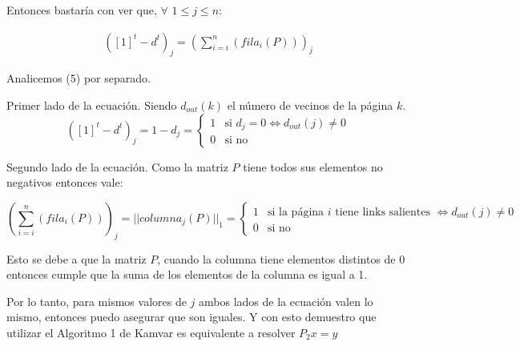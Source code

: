 Entonces bastar\'ia con ver que, $\forall$ $ 1 \leq j \leq n$:

\begin{align}
	([1]^{t} -d^{t})_{j} = \left(\sum_{i=i}^{n}(fila_{i}(P))\right)_{j}
\end{align}

Analicemos (5) por separado.

Primer lado de la ecuaci\'on. Siendo $d_{out}(k)$ el n\'umero de vecinos de la p\'agina $k$.
\[
	([1]^{t} -d^{t})_{j} = 
	1 - d_{j} = 
	\begin{cases}
		1 & \text{si }d_{j} = 0 \iff d_{out}(j) \neq 0 \\
		0 & \text{si no}
	\end{cases}
\]

Segundo lado de la ecuaci\'on. Como la matriz $P$ tiene todos sus elementos no negativos entonces vale:

\[
	\left(\sum_{i=i}^{n}(fila_{i}(P))\right)_{j} = ||columna_{j}(P)||_{1} =
		\begin{cases}
		1 & \text{si la p\'agina $i$ tiene links salientes } \iff d_{out}(j) \neq 0 \\
		0 & \text{si no}
	\end{cases}
\]

Esto se debe a que la matriz $P$, cuando la columna tiene elementos distintos de 0 entonces cumple que la suma de los elementos de la columna es igual a 1.

Por lo tanto, para mismos valores de $j$ ambos lados de la ecuaci\'on valen lo mismo, entonces puedo asegurar que son iguales. Y con esto demuestro que utilizar el Algoritmo 1 de Kamvar\cite{Kamvar2003} es equivalente a resolver $P_{2}x = y$